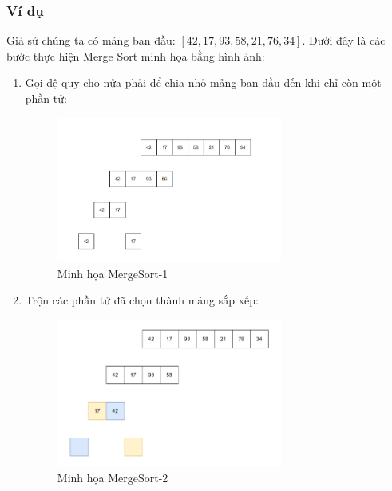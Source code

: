 \subsubsection{Ví dụ}

Giả sử chúng ta có mảng ban đầu: $[42, 17, 93, 58, 21, 76, 34]$. Dưới đây là các bước thực hiện Merge Sort minh họa bằng hình ảnh:

\begin{enumerate}
    \item Gọi đệ quy cho nửa phải để chia nhỏ mảng ban đầu đến khi chỉ còn một phần tử:
    \begin{figure}[H]
        \centering
        \includegraphics[width=0.7\textwidth]{img/merge_sort/1.png}
        \caption{Minh họa MergeSort-1}
    \end{figure}
    
    \item Trộn các phần tử đã chọn thành mảng sắp xếp:
    \begin{figure}[H]
        \centering
        \includegraphics[width=0.7\textwidth]{img/merge_sort/2.png}
        \caption{Minh họa MergeSort-2}
    \end{figure}
    

\end{enumerate}
